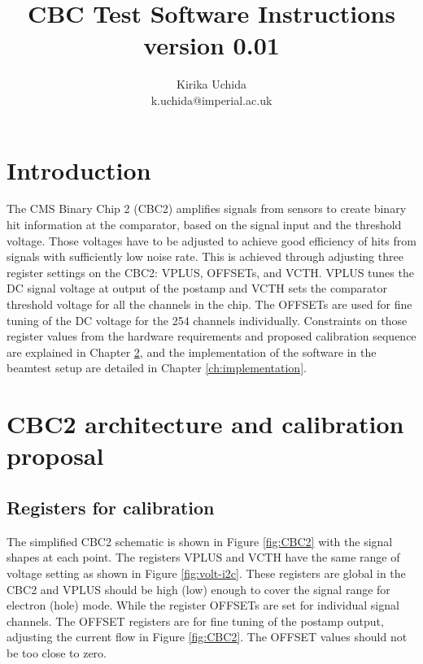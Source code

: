 \documentclass[11pt,a4paper]{article}
\begin{document}
\title{CBC Test Software Instructions \\ version 0.01}

\author{Kirika Uchida\\
	k.uchida@imperial.ac.uk}

	\maketitle
	\tableofcontents
	\listoffigures %
	\listoftables  %

	\section{Introduction}
	The CMS Binary Chip 2 (CBC2) amplifies signals from sensors to create binary hit information at the comparator, 
	based on the signal input and the threshold voltage. 
	Those voltages have to be adjusted to achieve good efficiency of hits from signals with sufficiently low noise rate. 
	This is achieved through adjusting three register settings on the CBC2: VPLUS, OFFSETs, and VCTH.  
	VPLUS tunes the DC signal voltage at output of the postamp and VCTH sets the comparator threshold voltage for all the channels in the chip.  
	The OFFSETs are used for fine tuning of the DC voltage for the 254 channels individually. 
	Constraints on those register values from the hardware requirements and 
	proposed calibration sequence are explained in Chapter \ref{ch:architecture-proposal}, 
	and the implementation of the software in the beamtest setup are detailed in Chapter \ref{ch:implementation}.  

	\section{CBC2 architecture and calibration proposal}\label{ch:architecture-proposal}
	\subsection{Registers for calibration}\label{sec:reg}
	The simplified CBC2 schematic is shown in Figure \ref{fig:CBC2} with the signal shapes at each point.  
	The registers VPLUS and VCTH have the same range of voltage setting as shown in Figure \ref{fig:volt-i2c}. 
	These registers are global in the CBC2 and VPLUS should be high (low) enough to cover the signal range for electron (hole) mode.
	While the register OFFSETs are set for individual signal channels. 
	The OFFSET registers are for fine tuning of the postamp output, adjusting the current flow in Figure \ref{fig:CBC2}. The OFFSET values should not be too close to zero. 
\end{document}
